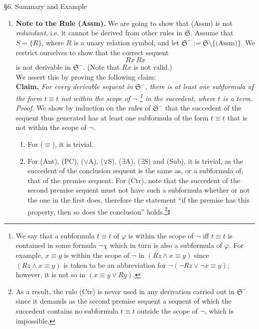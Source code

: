 \ 
\\
\\
{\large \S6. Summary and Example}
\begin{enumerate}[1.]
\item \textbf{Note to the Rule (Assm).} We are going to show that (Assm) is not \emph{redundant}, i.e. it cannot be derived from other rules in $\mathfrak{S}$. Assume that $S = \{ R \}$, where $R$ is a unary relation symbol, and let $\mathfrak{S}^- := \mathfrak{S} \setminus \{ \mbox{(Assm)} \}$. We restrict ourselves to show that the correct sequent
\[
Rx \ Rx
\]
is not derivable in $\mathfrak{S}^-$. (Note that $Rx$ is not valid.)\newline
\\
We assert this by proving the following claim:\newline
\\
\textbf{Claim.} \textit{For every derivable sequent in $\mathfrak{S}^-$, there is at least one subformula of the form $t \equiv t$ not within the scope of $\neg$ \footnote{We say that a subformula $t \equiv t$ of $\varphi$ is within the scope of $\neg$ iff $t \equiv t$ is contained in some formula $\neg\chi$ which in turn is also a subformula of $\varphi$. For example, $x \equiv y$ is within the scope of $\neg$ in $(Rz \land x \equiv y)$ since $(Rz \land x \equiv y)$ is taken to be an abbreviation for $\neg(\neg Rz \lor \neg x \equiv y)$; however, it is not so in $(x \equiv y \lor Ry)$.} in the succedent, where $t$ is a term.}\newline
\\
\textit{Proof.} We show by induction on the rules of $\mathfrak{S}^-$ that the succedent of the sequent thus generated has at least one subformula of the form $t \equiv t$ that is not within the scope of $\neg$.
\begin{enumerate}[(1)]
\item For ($\equiv$), it is trivial.
\item For (Ant), (PC), ($\lor\mathrm{A}$), ($\lor\mathrm{S}$), ($\exists\mathrm{A}$), ($\exists\mathrm{S}$) and (Sub), it is trivial, as the succedent of the conclusion sequent is the same as, or a subformula of, that of the premise sequent. For (Ctr), note that the succedent of the second premise sequent must not have such a subformula whether or not the one in the first does, therefore the statement ``if the premise has this property, then so does the conclusion'' holds.\footnote{As a result, the rule (Ctr) is never used in any derivation carried out in $\mathfrak{S}^-$ since it demands as the second premise sequent a sequent of which the succedent contains no subformula $t \equiv t$ outside the scope of $\neg$, which is impossible.}\nolinebreak\hfill$\talloblong$

\end{enumerate}
\end{enumerate}
